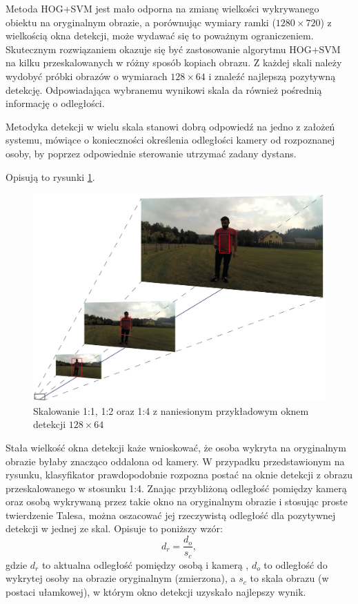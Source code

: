 Metoda HOG+SVM jest mało odporna na zmianę wielkości wykrywanego obiektu na oryginalnym obrazie, a porównując wymiary ramki ($1280\times 720$) z wielkością okna detekcji, może wydawać się to poważnym ograniczeniem. Skutecznym rozwiązaniem okazuje się być zastosowanie algorytmu HOG+SVM na kilku przeskalowanych w różny sposób kopiach obrazu. Z każdej skali należy wydobyć próbki obrazów o wymiarach $128\times 64$ i znaleźć najlepszą pozytywną detekcję. Odpowiadająca wybranemu wynikowi skala da również pośrednią informację o odległości. 

Metodyka detekcji w wielu skala stanowi dobrą odpowiedź na jedno z założeń systemu, mówiące o konieczności określenia odległości kamery od rozpoznanej osoby, by poprzez odpowiednie sterowanie utrzymać zadany dystans.  %

Opisują to rysunki \ref{fig:HOG_scaling}. %
\begin{figure}[h]
	\centering
	\captionsetup{justification=centering,margin=1cm}
	\hspace*{0cm}
	\includegraphics[width=15.5cm]{2_scaling.jpg}
	\caption{Skalowanie 1:1, 1:2 oraz 1:4 z naniesionym przykładowym oknem detekcji $128 \times 64$}
	\label{fig:HOG_scaling}
\end{figure}
\newline

Stała wielkość okna detekcji każe wnioskować, że osoba wykryta na oryginalnym obrazie byłaby znacząco oddalona od kamery. W przypadku przedstawionym na rysunku, klasyfikator prawdopodobnie rozpozna postać na oknie detekcji z obrazu przeskalowanego w stosunku 1:4. %
Znając przybliżoną odległość pomiędzy kamerą oraz osobą wykrywaną przez takie okno na oryginalnym obrazie i stosując proste twierdzenie Talesa, można oszacować jej rzeczywistą odległość dla pozytywnej detekcji w jednej ze skal. Opisuje to poniższy wzór:
\begin{equation}
\label{eq:scaling}
d_r=\frac{d_o}{s_c},
\end{equation}
gdzie $d_r$ to aktualna odległość pomiędzy osobą i kamerą , $d_o$ to odległość do wykrytej osoby na obrazie oryginalnym (zmierzona), a $s_c$ to skala obrazu (w postaci ułamkowej), w którym okno detekcji uzyskało najlepszy wynik.

